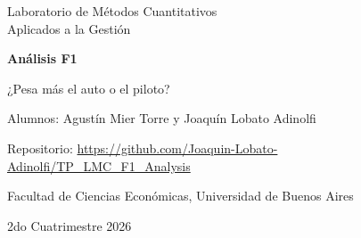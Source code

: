 \documentclass[11pt,a4paper]{article}
\begin{document}
\begin{titlepage}
    \centering
    \vspace*{3cm}
    {\LARGE Laboratorio de Métodos Cuantitativos\\ Aplicados a la Gestión\par}
    \vspace{2cm}
    {\Huge\bfseries Análisis F1\par}
    \vspace{0.5cm}
    {\Large ¿Pesa más el auto o el piloto?\par}
    \vfill
    {\large Alumnos: Agustín Mier Torre y Joaquín Lobato Adinolfi\par}
    \vspace{0.3cm}
    {\normalsize Repositorio: \url{https://github.com/Joaquin-Lobato-Adinolfi/TP_LMC_F1_Analysis}\par}
    \vspace{0.5cm}
    {\large Facultad de Ciencias Económicas, Universidad de Buenos Aires\par}
    \vspace{0.3cm}
    {\large 2do Cuatrimestre 2026\par}
\end{titlepage}


\begin{abstract}
El trabajo analiza si el resultado de una carrera de Fórmula 1 depende más del
rendimiento del auto o del talento del piloto, con el dataset \emph{Formula 1
World Championship} restringido a 2010--2024 (305 carreras). Se usan solo los
autos que terminaron la carrera y, dentro de ellos, las 2.209 carreras en que
los dos pilotos de un mismo equipo llegaron a la meta. La posición de cada
piloto se separa en el aporte del auto (cuánto se aleja su equipo del promedio
de la carrera) y el aporte del piloto (cuánto se aleja de su compañero, que
maneja el mismo auto). El auto mueve en promedio 4,75 posiciones y el piloto
1,97: el auto pesa unas 2,4 veces más, y es así en las quince temporadas
analizadas.
\end{abstract}

\end{document}

